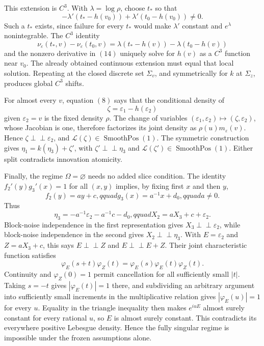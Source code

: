This extension is \(C^3\).  With \(\lambda=\log\rho\), choose \(t_*\) so that
\[
 -\lambda'(t_*-h(v_0))+\lambda'(t_0-h(v_0))\ne0.
\tag{14}
\]
Such a \(t_*\) exists, since failure for every \(t_*\) would make \(\lambda'\) constant and \(e^\lambda\) nonintegrable.  The \(C^3\) identity
\[
 \nu_\varepsilon(t_*,v)-\nu_\varepsilon(t_0,v)
 =\lambda(t_*-h(v))-\lambda(t_0-h(v))
\tag{15}
\]
and the nonzero derivative in \((14)\) uniquely solve for \(h(v)\) as a \(C^3\) function near \(v_0\).  The already obtained continuous extension must equal that local solution.  Repeating at the closed discrete set \(\Sigma_v\), and symmetrically for \(k\) at \(\Sigma_z\), produces global \(C^3\) shifts.

For almost every \(v\), equation \((8)\) says that the conditional density of
\[
 \zeta=\varepsilon_1-h(\varepsilon_2)
\]
given \(\varepsilon_2=v\) is the fixed density \(\rho\).  The change of variables \((\varepsilon_1,\varepsilon_2)\mapsto(\zeta,\varepsilon_2)\), whose Jacobian is one, therefore factorizes its joint density as \(\rho(u)m_\varepsilon(v)\).  Hence \(\zeta\perp\!\!\!\perp\varepsilon_2\), and \(\mathcal L(\zeta)\in\operatorname{SmoothPos}(1)\).  The symmetric construction gives \(\eta_1=k(\eta_3)+\zeta'\), with \(\zeta'\perp\!\!\!\perp\eta_3\) and \(\mathcal L(\zeta')\in\operatorname{SmoothPos}(1)\).  Either split contradicts innovation atomicity.

Finally, the regime \(\Omega=\varnothing\) needs no added slice condition.  The identity \(f_2'(y)g_3'(x)=1\) for all \((x,y)\) implies, by fixing first \(x\) and then \(y\),
\[
 f_2(y)=ay+c,qquad g_3(x)=a^{-1}x+d_0,qquad a\ne0.
\tag{16}
\]
Thus
\[
 \eta_3=-a^{-1}\varepsilon_2-a^{-1}c-d_0,qquad
 X_2=aX_3+c+\varepsilon_2.
\tag{17}
\]
Block-noise independence in the first representation gives \(X_3\perp\!\!\!\perp\varepsilon_2\), while block-noise independence in the second gives \(X_2\perp\!\!\!\perp\eta_3\).  With \(E=\varepsilon_2\) and \(Z=aX_3+c\), this says \(E\perp\!\!\!\perp Z\) and \(E\perp\!\!\!\perp E+Z\).  Their joint characteristic function satisfies
\[
 \varphi_E(s+t)\varphi_Z(t)
 =\varphi_E(s)\varphi_E(t)\varphi_Z(t).
\tag{18}
\]
Continuity and \(\varphi_Z(0)=1\) permit cancellation for all sufficiently small \(|t|\).  Taking \(s=-t\) gives \(|\varphi_E(t)|=1\) there, and subdividing an arbitrary argument into sufficiently small increments in the multiplicative relation gives \(|\varphi_E(u)|=1\) for every \(u\).  Equality in the triangle inequality then makes \(e^{iuE}\) almost surely constant for every rational \(u\), so \(E\) is almost surely constant.  This contradicts its everywhere positive Lebesgue density.  Hence the fully singular regime is impossible under the frozen assumptions alone.

